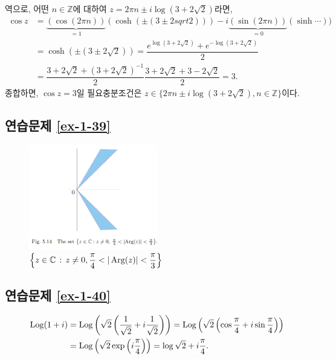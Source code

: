 역으로, 어떤 $n\in\mathbb Z$에 대하여 $z=2\pi n \pm i \log(3+2\sqrt{2})$라면,
\begin{align*}
\cos z &= \underbrace{(\cos(2\pi n))}_{=1} (\cosh (\pm(3\pm2sqrt{2})))
- i \underbrace{(\sin(2\pi n))}_{=0}(\sinh \cdots)) \\
&= \cosh(\pm(3\pm 2\sqrt{2})) = \dfrac{e^{\log(3+2\sqrt{2})}+ e^{-\log(3+2\sqrt{2})}}2 \\
&= \dfrac{3+2\sqrt{2} + (3+2\sqrt{2})^{-1}}2 
\dfrac{3+2\sqrt{2} + 3-2\sqrt{2}}2 = 3.
\end{align*}
종합하면, $\cos z =3$일 필요충분조건은
$z \in \{ 2\pi n \pm i \log(3+2\sqrt{2}), n\in\mathbb Z\}$이다.

\subsection*{연습문제 \ref{ex-1-39}}

\begin{figure}[h!]
\begin{center}
\includegraphics[width=0.5\textwidth]{./figs/fig-5-14}
\end{center}
\caption{$\left\{ z \in\mathbb C \,:\, z\ne0, \displaystyle\frac\pi4 < |\mathop{\mathrm{Arg}}(z)| < \displaystyle\frac\pi3 \right\}$
}
\label{fig-5-14}
\end{figure}

\subsection*{연습문제 \ref{ex-1-40}}

\begin{align*}
\mathop{\mathrm{Log}}(1+i) &= \mathop{\mathrm{Log}}\left( \sqrt{2} \left( \displaystyle\frac1{\sqrt{2}} + i \displaystyle\frac1{\sqrt{2}} \right)\right)
= \mathop{\mathrm{Log}}\left( \sqrt{2} \left( \cos\displaystyle\frac\pi4 + i \sin\displaystyle\frac\pi4 \right)\right) \\
&= \mathop{\mathrm{Log}}\left(\sqrt{2}\exp\left(i \displaystyle\frac\pi4\right)\right) = \log\sqrt{2} + i \displaystyle\frac\pi4.
\end{align*}

